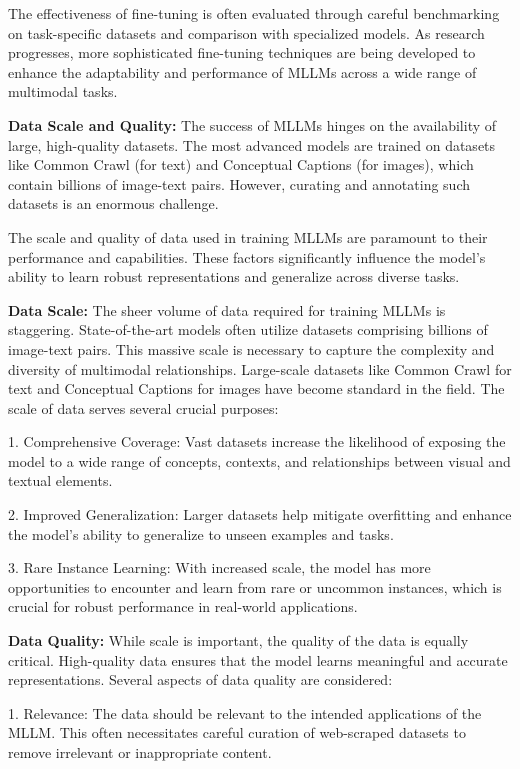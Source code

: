 The effectiveness of fine-tuning is often evaluated through careful benchmarking on task-specific datasets and comparison with specialized models. As research progresses, more sophisticated fine-tuning techniques are being developed to enhance the adaptability and performance of MLLMs across a wide range of multimodal tasks.


\textbf{Data Scale and Quality:} The success of MLLMs hinges on the availability of large, high-quality datasets. The most advanced models are trained on datasets like Common Crawl (for text) and Conceptual Captions (for images), which contain billions of image-text pairs. However, curating and annotating such datasets is an enormous challenge.

The scale and quality of data used in training MLLMs are paramount to their performance and capabilities. These factors significantly influence the model's ability to learn robust representations and generalize across diverse tasks.

\textbf{Data Scale:} The sheer volume of data required for training MLLMs is staggering. State-of-the-art models often utilize datasets comprising billions of image-text pairs. This massive scale is necessary to capture the complexity and diversity of multimodal relationships. Large-scale datasets like Common Crawl for text and Conceptual Captions for images have become standard in the field. The scale of data serves several crucial purposes:

1. Comprehensive Coverage: Vast datasets increase the likelihood of exposing the model to a wide range of concepts, contexts, and relationships between visual and textual elements.

2. Improved Generalization: Larger datasets help mitigate overfitting and enhance the model's ability to generalize to unseen examples and tasks.

3. Rare Instance Learning: With increased scale, the model has more opportunities to encounter and learn from rare or uncommon instances, which is crucial for robust performance in real-world applications.

\textbf{Data Quality:} While scale is important, the quality of the data is equally critical. High-quality data ensures that the model learns meaningful and accurate representations. Several aspects of data quality are considered:

1. Relevance: The data should be relevant to the intended applications of the MLLM. This often necessitates careful curation of web-scraped datasets to remove irrelevant or inappropriate content.

